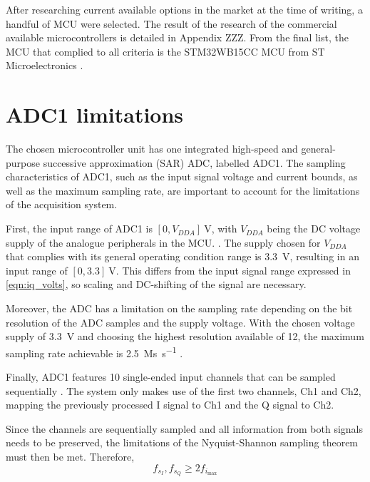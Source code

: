 After researching current available options in the market at the time of writing, a handful of MCU were selected. The result of the research of the commercial available microcontrollers is detailed in Appendix ZZZ. From the final list, the MCU that complied to all criteria is the STM32WB15CC MCU from ST Microelectronics \cite{STMicroelectronics2022}.

\section{ADC1 limitations}

The chosen microcontroller unit has one integrated high-speed and general-purpose successive approximation (SAR) ADC, labelled ADC1. The sampling characteristics of ADC1, such as the input signal voltage and current bounds, as well as the maximum sampling rate, are important to account for the limitations of the acquisition system.

First, the input range of ADC1 is $[0, V_{DDA}]\ \si{\volt}$, with $V_{DDA}$ being the DC voltage supply of the analogue peripherals in the MCU.
\cite[p.~103]{STMicroelectronics2022}. The supply chosen for $V_{DDA}$ that complies with its general operating condition range \cite[p.~62]{STMicroelectronics2022} is \SI{3.3}{\volt}, resulting in an input range of $[0, 3.3]\ \si{\volt}$. This differs from the input signal range expressed in \cref{eqn:iq_volts}, so scaling and DC-shifting of the signal are necessary.

Moreover, the ADC has a limitation on the sampling rate depending on the bit resolution of the ADC samples and the supply voltage. With the chosen voltage supply of \SI{3.3}{\volt} and choosing the highest resolution available of \SI{12}{\bit}, the maximum sampling rate achievable is \SI{2.5}{\mega s\per\second} \cite[p.~103]{STMicroelectronics2022}.

Finally, ADC1 features 10 single-ended input channels that can be sampled sequentially \cite[p.~355]{STMicroelectronics2022a}. The system only makes use of the first two channels, Ch1 and Ch2, mapping the previously processed I signal to Ch1 and the Q signal to Ch2.

Since the channels are sequentially sampled and all information from both signals needs to be preserved, the limitations of the Nyquist-Shannon sampling theorem must then be met. Therefore,
\begin{equation} \label{eqn:nyquist_sampling}
	f_{s_{I}}, f_{s_{Q}} \ge 2 f_{i_{\max}}
\end{equation}

